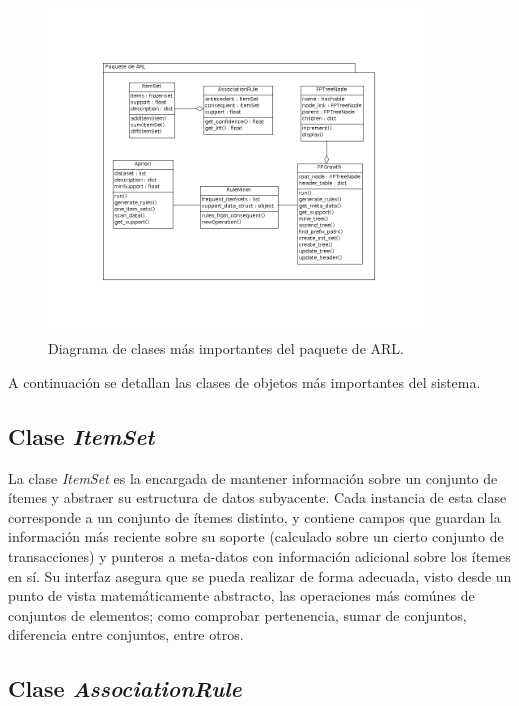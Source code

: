 \begin{figure}[h!]
\begin{center}
\includegraphics[width=0.9\textwidth]{imagenes/arl_diag_clases.png}
\end{center}
\vspace*{-5mm}
\caption{Diagrama de clases más importantes del paquete de ARL.}
\label{fig:arl_diag_clases}
\end{figure}

A continuación se detallan las clases de objetos más importantes del sistema.

\subsection{Clase \textit{ItemSet}}

La clase \textit{ItemSet} es la encargada de mantener información sobre un conjunto de ítemes y abstraer su estructura de datos subyacente. Cada instancia de esta clase corresponde a un conjunto de ítemes distinto, y contiene campos que guardan la información más reciente sobre su soporte (calculado sobre un cierto conjunto de transacciones) y punteros a meta-datos con información adicional sobre los ítemes en sí. Su interfaz asegura que se pueda realizar de forma adecuada, visto desde un punto de vista matemáticamente abstracto, las operaciones más comúnes de conjuntos de elementos; como comprobar pertenencia, sumar de conjuntos, diferencia entre conjuntos, entre otros.

\subsection{Clase \textit{AssociationRule}}

